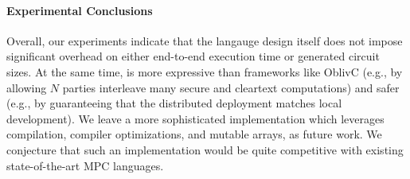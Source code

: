 \paragraph{Experimental Conclusions}
Overall, our experiments indicate that the langauge design itself does not
impose significant overhead on either end-to-end execution time or generated
circuit sizes.
At the same time, \system{} is more expressive than frameworks like
OblivC (e.g., by allowing $N$ parties interleave many secure and cleartext computations)
and safer (e.g., by guaranteeing that the distributed deployment matches local
development). We leave a more sophisticated implementation which leverages
compilation, compiler optimizations, and mutable arrays, as future work. We
conjecture that such an implementation would be quite competitive with existing
state-of-the-art MPC languages.
